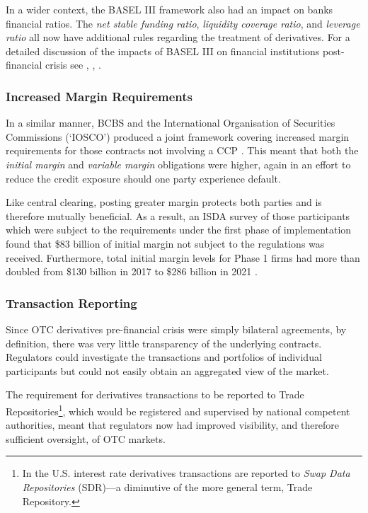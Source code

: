In a wider context, the BASEL III framework also had an impact on banks financial ratios. The \textit{net stable funding ratio}, \textit{liquidity coverage ratio}, and \textit{leverage ratio} all now have additional rules regarding the treatment of derivatives. For a detailed discussion of the impacts of BASEL III on financial institutions post-financial crisis see \cite{blundell2010thinking}, \cite{cosimano2011bank}, \cite{slovik2011macroeconomic}.

\subsubsection{Increased Margin Requirements}
In a similar manner, BCBS and the International Organisation of Securities Commissions (`IOSCO') produced a joint framework covering increased margin requirements for those contracts not involving a CCP \citep{IOSCO_Ch2_1}. This meant that both the \textit{initial margin} and \textit{variable margin} obligations were higher, again in an effort to reduce the credit exposure should one party experience default.

Like central clearing, posting greater margin protects both parties and is therefore mutually beneficial. As a result, an ISDA survey of those participants which were subject to the requirements under the first phase of implementation found that \$83 billion of initial margin not subject to the regulations was received. Furthermore, total initial margin levels for Phase 1 firms had more than doubled from \$130 billion in 2017 to \$286 billion in 2021 \citep{ISDA_Ch2_2}. 

\subsubsection{Transaction Reporting}
Since OTC derivatives pre-financial crisis were simply bilateral agreements, by definition, there was very little transparency of the underlying contracts. Regulators could investigate the transactions and portfolios of individual participants but could not easily obtain an aggregated view of the market. 

The requirement for derivatives transactions to be reported to Trade Repositories\footnote{In the U.S. interest rate derivatives transactions are reported to \textit{Swap Data Repositories} (SDR)––a diminutive of the more general term, Trade Repository.}, which would be registered and supervised by national competent authorities, meant that regulators now had improved visibility, and therefore sufficient oversight, of OTC markets.

